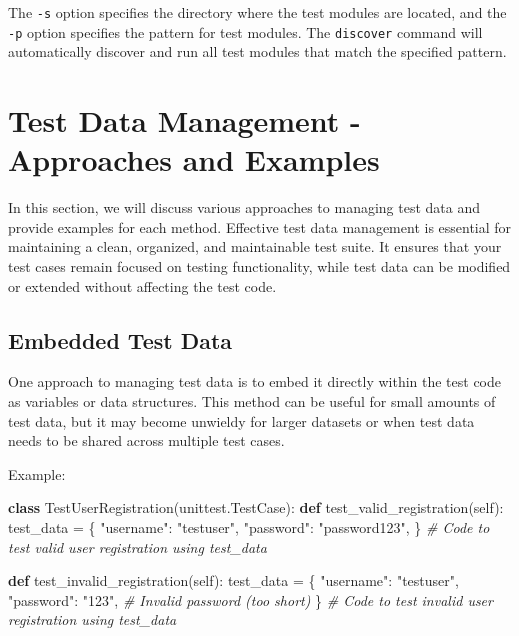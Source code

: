 \documentclass[
  paper=a4,
  ,captions=tableheading
]{scrartcl}
\newenvironment{Shaded}{}{}
\newcommand{\CommentTok}[1]{\textcolor[rgb]{0.38,0.63,0.69}{\textit{#1}}}
\newcommand{\KeywordTok}[1]{\textcolor[rgb]{0.00,0.44,0.13}{\textbf{#1}}}
\newcommand{\NormalTok}[1]{#1}
\newcommand{\OperatorTok}[1]{\textcolor[rgb]{0.40,0.40,0.40}{#1}}
\newcommand{\StringTok}[1]{\textcolor[rgb]{0.25,0.44,0.63}{#1}}
\newcommand{\VariableTok}[1]{\textcolor[rgb]{0.10,0.09,0.49}{#1}}
\begin{document}
The \texttt{-s} option specifies the directory where the test modules
are located, and the \texttt{-p} option specifies the pattern for test
modules. The \texttt{discover} command will automatically discover and
run all test modules that match the specified pattern.

\hypertarget{test-data-management---approaches-and-examples}{%
\section{Test Data Management - Approaches and
Examples}\label{test-data-management---approaches-and-examples}}

In this section, we will discuss various approaches to managing test
data and provide examples for each method. Effective test data
management is essential for maintaining a clean, organized, and
maintainable test suite. It ensures that your test cases remain focused
on testing functionality, while test data can be modified or extended
without affecting the test code.

\hypertarget{embedded-test-data}{%
\subsection{Embedded Test Data}\label{embedded-test-data}}

One approach to managing test data is to embed it directly within the
test code as variables or data structures. This method can be useful for
small amounts of test data, but it may become unwieldy for larger
datasets or when test data needs to be shared across multiple test
cases.

Example:

\begin{Shaded}
\begin{Highlighting}[]
\KeywordTok{class}\NormalTok{ TestUserRegistration(unittest.TestCase):}
    \KeywordTok{def}\NormalTok{ test\_valid\_registration(}\VariableTok{self}\NormalTok{):}
\NormalTok{        test\_data }\OperatorTok{=}\NormalTok{ \{}
            \StringTok{"username"}\NormalTok{: }\StringTok{"testuser"}\NormalTok{,}
            \StringTok{"password"}\NormalTok{: }\StringTok{"password123"}\NormalTok{,}
\NormalTok{        \}}
        \CommentTok{\# Code to test valid user registration using test\_data}

    \KeywordTok{def}\NormalTok{ test\_invalid\_registration(}\VariableTok{self}\NormalTok{):}
\NormalTok{        test\_data }\OperatorTok{=}\NormalTok{ \{}
            \StringTok{"username"}\NormalTok{: }\StringTok{"testuser"}\NormalTok{,}
            \StringTok{"password"}\NormalTok{: }\StringTok{"123"}\NormalTok{,  }\CommentTok{\# Invalid password (too short)}
\NormalTok{        \}}
        \CommentTok{\# Code to test invalid user registration using test\_data}
\end{Highlighting}
\end{Shaded}
\end{document}
